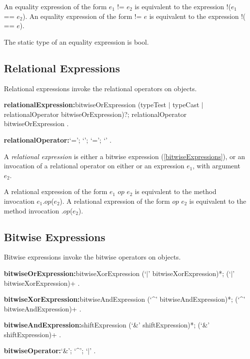 \documentclass{article}
\newcommand{\code}[1]{{\sf #1}}
\begin{document}
\LMHash{}
An equality expression of the form \code{$e_1$ != $e_2$}  is equivalent to the expression \code{!($e_1$ == $e_2$)}. An equality expression of the form \code{\SUPER{} != $e$} is equivalent to the expression \code{!(\SUPER{} == $e$)}.


 
 

\LMHash{}
 The static type of an equality expression is \code{bool}.
 
 
\subsection{ Relational Expressions}

\LMHash{}
Relational expressions invoke the relational operators on objects.

 \begin{grammar}
{\bf relationalExpression:}bitwiseOrExpression (typeTest $|$ typeCast $|$  relationalOperator bitwiseOrExpression)?;
      \SUPER{} relationalOperator bitwiseOrExpression
    .


{\bf relationalOperator:}`{\escapegrammar \gt=}';
      `{\escapegrammar \gt}';
      `{\escapegrammar \lt}=';
      `{\escapegrammar \lt}'
    .
 \end{grammar}
 
\LMHash{}
A {\em relational expression} is either a bitwise expression (\ref{bitwiseExpressions}), or an invocation of a relational operator on either \SUPER{} or an expression $e_1$, with argument $e_2$.
 
\LMHash{}
A relational expression of the form  $e_1$ $op$ $e_2$ is equivalent to the method invocation \code{$e_1$.$op$($e_2$)}. A relational expression of the form  \SUPER{} $op$ $e_2$ is equivalent to the method invocation \code{\SUPER{}.$op$($e_2$)}. 

\subsection{ Bitwise Expressions}

\LMHash{}
Bitwise expressions invoke the bitwise operators on objects.

 \begin{grammar}
{\bf bitwiseOrExpression:}bitwiseXorExpression (`$|$' bitwiseXorExpression)*;
      \SUPER{} (`$|$' bitwiseXorExpression)+
    .

{\bf bitwiseXorExpression:}bitwiseAndExpression (`\^{}' bitwiseAndExpression)*;
      \SUPER{} (`\^{}' bitwiseAndExpression)+
    .

{\bf bitwiseAndExpression:}shiftExpression (`\&' shiftExpression)*;
      \SUPER{} (`\&' shiftExpression)+
    .

{\bf bitwiseOperator:}`\&';
      `\^{}';
      `$|$'
    .
 \end{grammar}
 
\end{document}
